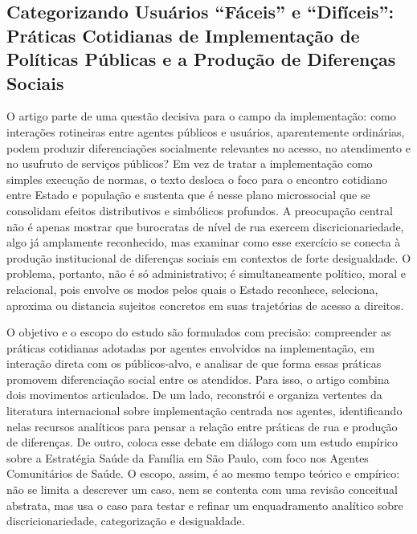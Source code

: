 \documentclass[12pt,a4paper]{article}
\begin{document}
\subsection{Categorizando Usuários “Fáceis” e “Difíceis”: Práticas Cotidianas de Implementação de Políticas Públicas e a Produção de Diferenças Sociais}
\label{sec:orgc7aa3de}

O artigo parte de uma questão decisiva para o campo da implementação: como interações rotineiras entre agentes públicos e usuários, aparentemente ordinárias, podem produzir diferenciações socialmente relevantes no acesso, no atendimento e no usufruto de serviços públicos? Em vez de tratar a implementação como simples execução de normas, o texto desloca o foco para o encontro cotidiano entre Estado e população e sustenta que é nesse plano microssocial que se consolidam efeitos distributivos e simbólicos profundos. A preocupação central não é apenas mostrar que burocratas de nível de rua exercem discricionariedade, algo já amplamente reconhecido, mas examinar como esse exercício se conecta à produção institucional de diferenças sociais em contextos de forte desigualdade. O problema, portanto, não é só administrativo; é simultaneamente político, moral e relacional, pois envolve os modos pelos quais o Estado reconhece, seleciona, aproxima ou distancia sujeitos concretos em suas trajetórias de acesso a direitos. \parencite{lotta2020_categorizando_usuarios}

O objetivo e o escopo do estudo são formulados com precisão: compreender as práticas cotidianas adotadas por agentes envolvidos na implementação, em interação direta com os públicos-alvo, e analisar de que forma essas práticas promovem diferenciação social entre os atendidos. Para isso, o artigo combina dois movimentos articulados. De um lado, reconstrói e organiza vertentes da literatura internacional sobre implementação centrada nos agentes, identificando nelas recursos analíticos para pensar a relação entre práticas de rua e produção de diferenças. De outro, coloca esse debate em diálogo com um estudo empírico sobre a Estratégia Saúde da Família em São Paulo, com foco nos Agentes Comunitários de Saúde. O escopo, assim, é ao mesmo tempo teórico e empírico: não se limita a descrever um caso, nem se contenta com uma revisão conceitual abstrata, mas usa o caso para testar e refinar um enquadramento analítico sobre discricionariedade, categorização e desigualdade. \parencite{lotta2020_categorizando_usuarios}
\end{document}
